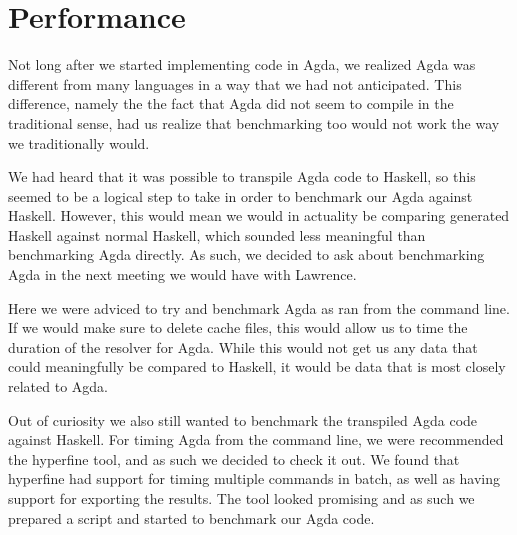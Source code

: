 \documentclass[a4paper,UKenglish,cleveref, autoref, thm-restate]{template/lipics-v2021}
\begin{document}
\section{Performance}


Not long after we started implementing code in Agda, we realized Agda was different from many languages in a way that we had not anticipated. This difference, namely the the fact that Agda did not seem to compile in the traditional sense, had us realize that benchmarking too would not work the way we traditionally would.\newline

We had heard that it was possible to transpile Agda code to Haskell, so this seemed to be a logical step to take in order to benchmark our Agda against Haskell. However, this would mean we would in actuality be comparing generated Haskell against normal Haskell, which sounded less meaningful than benchmarking Agda directly. As such, we decided to ask about benchmarking Agda in the next meeting we would have with Lawrence.
 
Here we were adviced to try and benchmark Agda as ran from the command line. If we would make sure to delete cache files, this would allow us to time the duration of the resolver for Agda. While this would not get us any data that could meaningfully be compared to Haskell, it would be data that is most closely related to Agda.\newline

Out of curiosity we also still wanted to benchmark the transpiled Agda code against Haskell. For timing Agda from the command line, we were recommended the hyperfine tool, and as such we decided to check it out. We found that hyperfine had support for timing multiple commands in batch, as well as having support for exporting the results. The tool looked promising and as such we prepared a script and started to benchmark our Agda code.\newline
\end{document}
